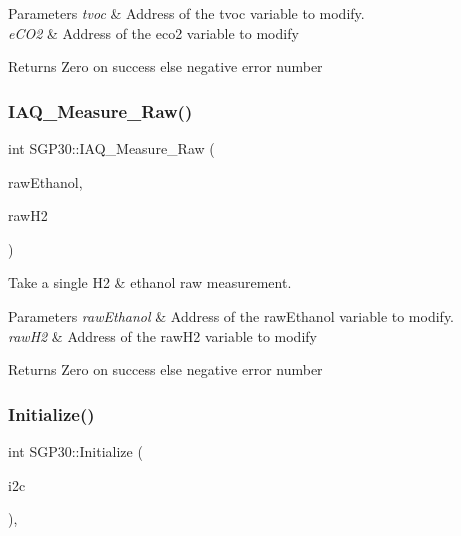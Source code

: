 \begin{DoxyParams}{Parameters}
{\em tvoc} & Address of the tvoc variable to modify. \\
\hline
{\em e\+C\+O2} & Address of the eco2 variable to modify\\
\hline
\end{DoxyParams}
\begin{DoxyReturn}{Returns}
Zero on success else negative error number 
\end{DoxyReturn}
\mbox{\label{classSGP30_aba7c9499ebc5a8aea6d3a5aaf23585ee}} 
\subsubsection{\texorpdfstring{I\+A\+Q\+\_\+\+Measure\+\_\+\+Raw()}{IAQ\_Measure\_Raw()}}
{\footnotesize\ttfamily int S\+G\+P30\+::\+I\+A\+Q\+\_\+\+Measure\+\_\+\+Raw (\begin{DoxyParamCaption}\item[{uint16\+\_\+t \&}]{raw\+Ethanol,  }\item[{uint16\+\_\+t \&}]{raw\+H2 }\end{DoxyParamCaption})}

Take a single H2 \& ethanol raw measurement.


\begin{DoxyParams}{Parameters}
{\em raw\+Ethanol} & Address of the raw\+Ethanol variable to modify. \\
\hline
{\em raw\+H2} & Address of the raw\+H2 variable to modify\\
\hline
\end{DoxyParams}
\begin{DoxyReturn}{Returns}
Zero on success else negative error number 
\end{DoxyReturn}
\mbox{\label{classSGP30_ad34fe8539ef007f55a0b3140889fdd6f}} 
\subsubsection{\texorpdfstring{Initialize()}{Initialize()}}
{\footnotesize\ttfamily int S\+G\+P30\+::\+Initialize (\begin{DoxyParamCaption}\item[{\hyperlink{classI2CDriver}{I2\+C\+Driver} \&}]{i2c }\end{DoxyParamCaption})\hspace{0.3cm}{\ttfamily [override]}, {\ttfamily [virtual]}}


